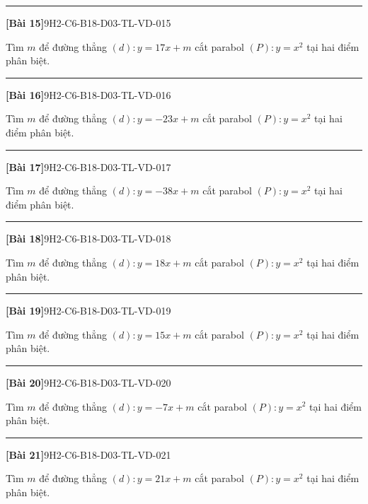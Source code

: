\documentclass[12pt,a4paper]{article}
\newif\ifloigiai
\newenvironment{cauhoi}[2]{%
  \par\medskip\noindent\rule{\textwidth}{0.4pt}\par\nopagebreak
  \noindent\textbf{[#1]}\hfill{\scriptsize\ttfamily #2}\par\nopagebreak\smallskip}{\par}
\newcommand{\loigiai}[1]{\ifloigiai\par\smallskip\noindent\textit{Lời giải.} #1\par\fi}
\begin{document}
\begin{cauhoi}{Bài 15}{9H2-C6-B18-D03-TL-VD-015}
Tìm $m$ để đường thẳng $(d): y=17x+m$ cắt parabol $(P): y=x^{2}$ tại hai điểm phân biệt.
\loigiai{Phương trình hoành độ giao điểm $x^{2}-17x-m=0$. Để $(d)$ cắt $(P)$ tại hai điểm phân biệt cần $\Delta=289+4m>0$, suy ra $m>-\dfrac{289}{4}$.}
\end{cauhoi}
\begin{cauhoi}{Bài 16}{9H2-C6-B18-D03-TL-VD-016}
Tìm $m$ để đường thẳng $(d): y=-23x+m$ cắt parabol $(P): y=x^{2}$ tại hai điểm phân biệt.
\loigiai{Phương trình hoành độ giao điểm $x^{2}+23x-m=0$. Để $(d)$ cắt $(P)$ tại hai điểm phân biệt cần $\Delta=529+4m>0$, suy ra $m>-\dfrac{529}{4}$.}
\end{cauhoi}
\begin{cauhoi}{Bài 17}{9H2-C6-B18-D03-TL-VD-017}
Tìm $m$ để đường thẳng $(d): y=-38x+m$ cắt parabol $(P): y=x^{2}$ tại hai điểm phân biệt.
\loigiai{Phương trình hoành độ giao điểm $x^{2}+38x-m=0$. Để $(d)$ cắt $(P)$ tại hai điểm phân biệt cần $\Delta=1444+4m>0$, suy ra $m>-361$.}
\end{cauhoi}
\begin{cauhoi}{Bài 18}{9H2-C6-B18-D03-TL-VD-018}
Tìm $m$ để đường thẳng $(d): y=18x+m$ cắt parabol $(P): y=x^{2}$ tại hai điểm phân biệt.
\loigiai{Phương trình hoành độ giao điểm $x^{2}-18x-m=0$. Để $(d)$ cắt $(P)$ tại hai điểm phân biệt cần $\Delta=324+4m>0$, suy ra $m>-81$.}
\end{cauhoi}
\begin{cauhoi}{Bài 19}{9H2-C6-B18-D03-TL-VD-019}
Tìm $m$ để đường thẳng $(d): y=15x+m$ cắt parabol $(P): y=x^{2}$ tại hai điểm phân biệt.
\loigiai{Phương trình hoành độ giao điểm $x^{2}-15x-m=0$. Để $(d)$ cắt $(P)$ tại hai điểm phân biệt cần $\Delta=225+4m>0$, suy ra $m>-\dfrac{225}{4}$.}
\end{cauhoi}
\begin{cauhoi}{Bài 20}{9H2-C6-B18-D03-TL-VD-020}
Tìm $m$ để đường thẳng $(d): y=-7x+m$ cắt parabol $(P): y=x^{2}$ tại hai điểm phân biệt.
\loigiai{Phương trình hoành độ giao điểm $x^{2}+7x-m=0$. Để $(d)$ cắt $(P)$ tại hai điểm phân biệt cần $\Delta=49+4m>0$, suy ra $m>-\dfrac{49}{4}$.}
\end{cauhoi}
\begin{cauhoi}{Bài 21}{9H2-C6-B18-D03-TL-VD-021}
Tìm $m$ để đường thẳng $(d): y=21x+m$ cắt parabol $(P): y=x^{2}$ tại hai điểm phân biệt.
\loigiai{Phương trình hoành độ giao điểm $x^{2}-21x-m=0$. Để $(d)$ cắt $(P)$ tại hai điểm phân biệt cần $\Delta=441+4m>0$, suy ra $m>-\dfrac{441}{4}$.}
\end{cauhoi}
\end{document}
